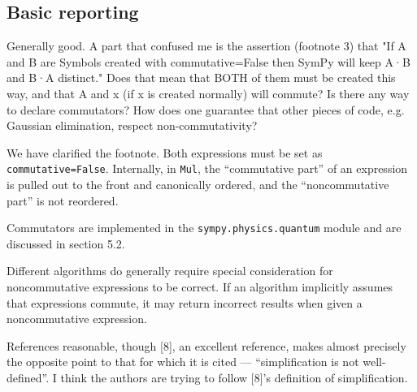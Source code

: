 \documentclass[answers,12pt]{exam}
\begin{document}
\subsection{Basic reporting}
\begin{questions}
\question Generally good. A part that confused me is the assertion (footnote 3) that "If
A and B are Symbols created with commutative=False then SymPy will keep A·B
and B·A distinct." Does that mean that BOTH of them must be created this way,
and that A and x (if x is created normally) will commute? Is there any way to
declare commutators? How does one guarantee that other pieces of code, e.g.
Gaussian elimination, respect non-commutativity?
\begin{solution}
  We have clarified the footnote. Both expressions must be set as
  \texttt{commutative=False}. Internally, in \texttt{Mul}, the ``commutative
  part'' of an expression is pulled out to the front and canonically ordered,
  and the ``noncommutative part'' is not reordered.

Commutators are implemented in the \texttt{sympy.physics.quantum} module and
are discussed in section 5.2.

Different algorithms do generally require special consideration for
noncommutative expressions to be correct. If an algorithm implicitly assumes
that expressions commute, it may return incorrect results when given a
noncommutative expression.
\end{solution}

\question References reasonable, though [8], an excellent reference, makes almost
precisely the opposite point to that for which it is cited --- ``simplification
is not well-defined''. I think the authors are trying to follow [8]'s
definition of simplification.
\begin{solution}
\end{solution}
\end{questions}
\end{document}
